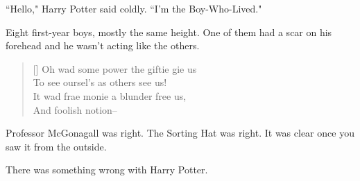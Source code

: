``Hello," Harry Potter said coldly. ``I'm the Boy-Who-Lived."

Eight first-year boys, mostly the same height. One of them had a scar on his forehead and he wasn't acting like the others.

\baselineskip\settowidth{\versewidth}{It wad frae monie a blunder free us,}
\begin{verse}[\versewidth]
Oh wad some power the giftie gie us\\
To see oursel's as others see us!\\
It wad frae monie a blunder free us,\\
And foolish notion\---
\end{verse}

Professor McGonagall was right. The Sorting Hat was right. It was clear once you saw it from the outside.

There was something wrong with Harry Potter.

